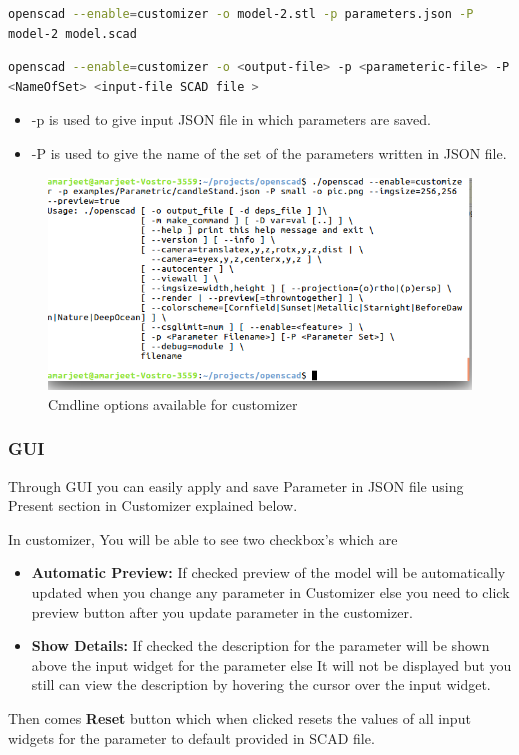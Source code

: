 \begin{lstlisting}[language=bash]
openscad --enable=customizer -o model-2.stl -p parameters.json -P 
model-2 model.scad
\end{lstlisting}

\begin{lstlisting}[language=bash]
openscad --enable=customizer -o <output-file> -p <parameteric-file> -P 
<NameOfSet> <input-file SCAD file >\end{lstlisting}

\begin{itemize}
    \item -p is used to give input JSON file in which parameters are saved.
    \item -P is used to give the name of the set of the parameters written in JSON file.
\end{itemize}

\begin{figure}
    \centering \includegraphics[width=\linewidth]{images/output/8.png}
    \caption{Cmdline options available for customizer}
    \label{fig:7}
\end{figure}

\subsubsection{GUI}

Through GUI you can easily apply and save Parameter in JSON file using Present section in Customizer explained below.

In customizer, You will be able to see two checkbox’s which are
\begin{itemize}
\item \textbf{Automatic Preview:}
If checked preview of the model will be automatically updated when you change any parameter in Customizer else you need to click preview button after you update parameter in the customizer.
\item \textbf{Show Details:}
If checked the description for the parameter will be shown above the input widget for the parameter else It will not be displayed but you still can view the description by hovering the cursor over the input widget.
\end{itemize}
Then comes \textbf{Reset} button which when clicked resets the values of all input widgets for the parameter to default provided in SCAD file.

